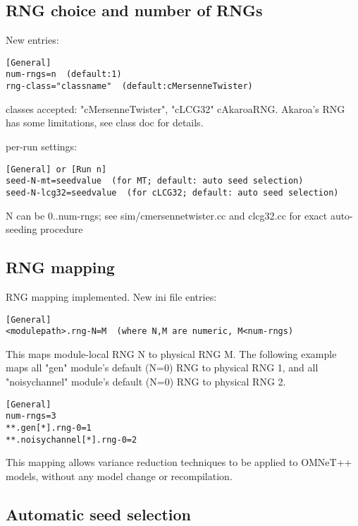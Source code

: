 \subsection{RNG choice and number of RNGs}

New  entries:

\begin{verbatim}
[General]
num-rngs=n  (default:1)
rng-class="classname"  (default:cMersenneTwister)
\end{verbatim}

classes accepted: "cMersenneTwister", "cLCG32"
cAkaroaRNG. Akaroa's RNG has some limitations, see class
doc for details.

per-run settings:

\begin{verbatim}
[General] or [Run n]
seed-N-mt=seedvalue  (for MT; default: auto seed selection)
seed-N-lcg32=seedvalue  (for cLCG32; default: auto seed selection)
\end{verbatim}

N can be 0..num-rngs; see sim/cmersennetwister.cc and clcg32.cc for
exact auto-seeding procedure


\subsection{RNG mapping}

RNG mapping implemented. New ini file entries:

\begin{verbatim}
[General]
<modulepath>.rng-N=M  (where N,M are numeric, M<num-rngs)
\end{verbatim}

This maps module-local RNG N to physical RNG M. The following
example maps all "gen" module's default (N=0) RNG to physical RNG 1,
and all "noisychannel" module's default (N=0) RNG to physical RNG 2.

\begin{verbatim}
[General]
num-rngs=3
**.gen[*].rng-0=1
**.noisychannel[*].rng-0=2
\end{verbatim}

This mapping allows variance reduction techniques to be applied to
OMNeT++ models, without any model change or recompilation.


\subsection{Automatic seed selection}

